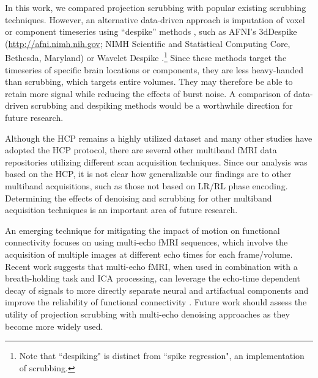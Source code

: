 \documentclass{article}
\begin{document}
In this work, we compared projection scrubbing with popular existing scrubbing techniques. However, an alternative data-driven approach is imputation of voxel or component timeseries using ``despike'' methods \citep{allen2011baseline}, such as AFNI's 3dDespike (\url{http://afni.nimh.nih.gov}; NIMH Scientific and Statistical Computing Core, Bethesda, Maryland) or Wavelet Despike \citep{patelWaveletMethodModeling2014}.\footnote{Note that ``despiking" is distinct from ``spike regression", an implementation of scrubbing.} Since these methods target the timeseries of specific brain locations or components, they are less heavy-handed than scrubbing, which targets entire volumes.  They may therefore be able to retain more signal while reducing the effects of burst noise. A comparison of data-driven scrubbing and despiking methods would be a worthwhile direction for future research. 

Although the HCP remains a highly utilized dataset and many other studies have adopted the HCP protocol, there are several other multiband fMRI data repositories utilizing different scan acquisition techniques. Since our analysis was based on the HCP, it is not clear how generalizable our findings are to other multiband acquisitions, such as those not based on LR/RL phase encoding. Determining the effects of denoising and scrubbing for other multiband acquisition techniques is an important area of future research.

An emerging technique for mitigating the impact of motion on functional connectivity  focuses on using multi-echo fMRI sequences, which involve the acquisition of multiple images at different echo times for each frame/volume. Recent work suggests that multi-echo fMRI, when used in combination with a breath-holding task and ICA processing, can leverage the echo-time dependent decay of signals to more directly separate neural and artifactual components and improve the reliability of functional connectivity \citep{lynch2020rapid}. Future work should assess the utility of projection scrubbing with multi-echo denoising approaches as they become more widely used.
\end{document}
